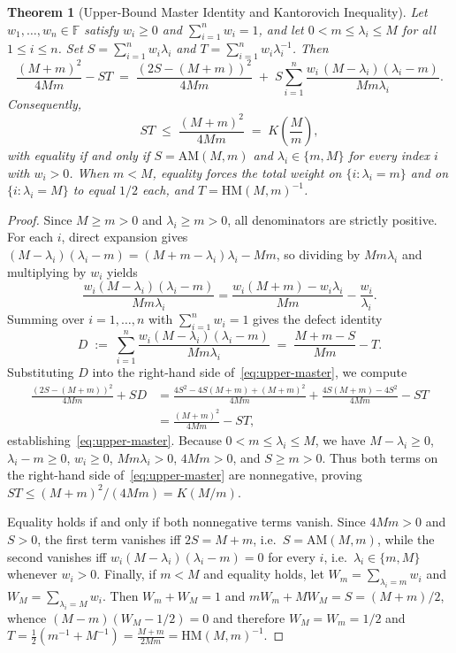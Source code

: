 \documentclass[11pt,a4paper]{article}
\newtheorem{theorem}{Theorem}[section]
\theoremstyle{definition}
\newcommand{\AM}{\mathrm{AM}}
\newcommand{\HM}{\mathrm{HM}}
\begin{document}
\begin{theorem}[Upper-Bound Master Identity and Kantorovich Inequality]
\label{thm:upper}
Let $w_1, \dots, w_n \in \mathbb{F}$ satisfy $w_i \ge 0$ and $\sum_{i=1}^n w_i = 1$,
and let $0 < m \le \lambda_i \le M$ for all $1 \le i \le n$. Set
$S = \sum_{i=1}^n w_i \lambda_i$ and $T = \sum_{i=1}^n w_i \lambda_i^{-1}$. Then
\begin{equation}
  \label{eq:upper-master}
  \frac{(M + m)^2}{4Mm} - S T
  \;=\; \frac{(2S - (M + m))^2}{4Mm}
  \;+\; S \sum_{i=1}^n \frac{w_i\,(M - \lambda_i)(\lambda_i - m)}{Mm\lambda_i}.
\end{equation}
Consequently,
\[
  S T \;\le\; \frac{(M + m)^2}{4Mm} \;=\; K\!\left(\frac{M}{m}\right),
\]
with equality if and only if $S = \AM(M,m)$ and $\lambda_i \in \{m, M\}$ for every
index $i$ with $w_i > 0$. When $m < M$, equality forces the total weight on
$\{i : \lambda_i = m\}$ and on $\{i : \lambda_i = M\}$ to equal $1/2$ each, and
$T = \HM(M,m)^{-1}$.
\end{theorem}
\begin{proof}
Since $M \ge m > 0$ and $\lambda_i \ge m > 0$, all denominators are strictly
positive. For each $i$, direct expansion gives
$(M - \lambda_i)(\lambda_i - m) = (M + m - \lambda_i)\lambda_i - Mm$, so dividing
by $Mm\lambda_i$ and multiplying by $w_i$ yields
\[
  \frac{w_i(M - \lambda_i)(\lambda_i - m)}{Mm\lambda_i}
  = \frac{w_i(M + m) - w_i\lambda_i}{Mm} - \frac{w_i}{\lambda_i}.
\]
Summing over $i = 1, \dots, n$ with $\sum_{i=1}^n w_i = 1$ gives the defect
identity
\[
  D \;:=\; \sum_{i=1}^n \frac{w_i(M - \lambda_i)(\lambda_i - m)}{Mm\lambda_i}
  \;=\; \frac{M + m - S}{Mm} - T.
\]
Substituting $D$ into the right-hand side of~\eqref{eq:upper-master}, we compute
\begin{align*}
  \frac{(2S - (M+m))^2}{4Mm} + S D
  &= \frac{4S^2 - 4S(M+m) + (M+m)^2}{4Mm}
     + \frac{4S(M+m) - 4S^2}{4Mm} - S T \\
  &= \frac{(M + m)^2}{4Mm} - S T,
\end{align*}
establishing~\eqref{eq:upper-master}. Because $0 < m \le \lambda_i \le M$, we have
$M - \lambda_i \ge 0$, $\lambda_i - m \ge 0$, $w_i \ge 0$, $Mm\lambda_i > 0$,
$4Mm > 0$, and $S \ge m > 0$. Thus both terms on the right-hand side
of~\eqref{eq:upper-master} are nonnegative, proving
$S T \le (M+m)^2/(4Mm) = K(M/m)$.

Equality holds if and only if both nonnegative terms vanish. Since $4Mm > 0$ and
$S > 0$, the first term vanishes iff $2S = M + m$, i.e.\ $S = \AM(M,m)$, while
the second vanishes iff $w_i(M - \lambda_i)(\lambda_i - m) = 0$ for every $i$,
i.e.\ $\lambda_i \in \{m, M\}$ whenever $w_i > 0$. Finally, if $m < M$ and
equality holds, let $W_m = \sum_{\lambda_i = m} w_i$ and
$W_M = \sum_{\lambda_i = M} w_i$. Then $W_m + W_M = 1$ and
$m W_m + M W_M = S = (M+m)/2$, whence $(M - m)(W_M - 1/2) = 0$ and therefore
$W_M = W_m = 1/2$ and $T = \frac{1}{2}(m^{-1} + M^{-1}) = \frac{M+m}{2Mm} =
\HM(M,m)^{-1}$.
\end{proof}
\end{document}
